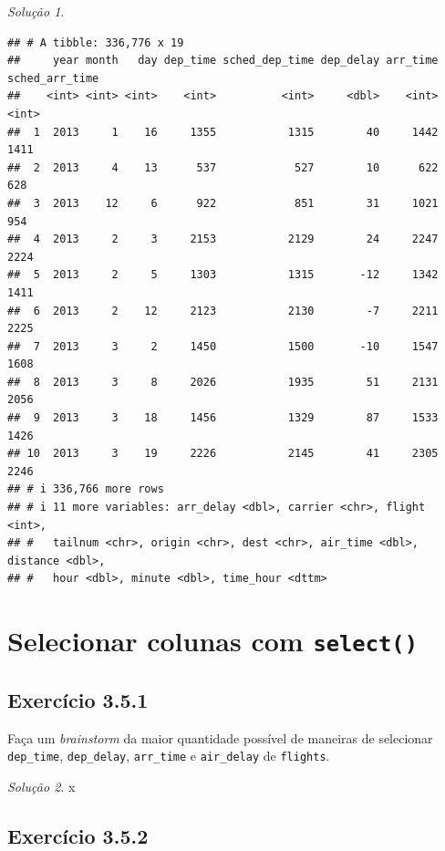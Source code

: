 \documentclass[
]{latex/krantz}
\theoremstyle{definition}
\theoremstyle{definition}
\theoremstyle{definition}
\theoremstyle{definition}
\theoremstyle{remark}
\newtheorem*{solution}{Solução}
\begin{document}
\begin{solution}
\begin{verbatim}
## # A tibble: 336,776 x 19
##     year month   day dep_time sched_dep_time dep_delay arr_time sched_arr_time
##    <int> <int> <int>    <int>          <int>     <dbl>    <int>          <int>
##  1  2013     1    16     1355           1315        40     1442           1411
##  2  2013     4    13      537            527        10      622            628
##  3  2013    12     6      922            851        31     1021            954
##  4  2013     2     3     2153           2129        24     2247           2224
##  5  2013     2     5     1303           1315       -12     1342           1411
##  6  2013     2    12     2123           2130        -7     2211           2225
##  7  2013     3     2     1450           1500       -10     1547           1608
##  8  2013     3     8     2026           1935        51     2131           2056
##  9  2013     3    18     1456           1329        87     1533           1426
## 10  2013     3    19     2226           2145        41     2305           2246
## # i 336,766 more rows
## # i 11 more variables: arr_delay <dbl>, carrier <chr>, flight <int>,
## #   tailnum <chr>, origin <chr>, dest <chr>, air_time <dbl>, distance <dbl>,
## #   hour <dbl>, minute <dbl>, time_hour <dttm>
\end{verbatim}

\end{solution}

\hypertarget{selecionar-colunas-com-select}{%
\section{\texorpdfstring{Selecionar colunas com \texttt{select()}}{Selecionar colunas com select()}}\label{selecionar-colunas-com-select}}

\hypertarget{exr3-5-1}{%
\subsection*{Exercício 3.5.1}\label{exr3-5-1}}

Faça um \emph{brainstorm} da maior quantidade possível de maneiras de selecionar \texttt{dep\_time}, \texttt{dep\_delay}, \texttt{arr\_time} e \texttt{air\_delay} de \texttt{flights}.

\begin{solution}
x
\end{solution}

\hypertarget{exr3-5-2}{%
\subsection*{Exercício 3.5.2}\label{exr3-5-2}}
\end{document}

